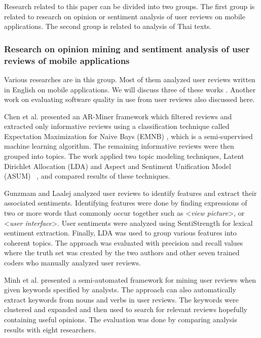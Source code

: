 Research related to this paper can be divided into two groups. The first group is related to research on opinion or sentiment analysis of user reviews on mobile applications. The second group is related to analysis of Thai texts.

\subsubsection{Research on opinion mining and sentiment analysis of user reviews of mobile applications} Various researches are in this group. Most of them analyzed user reviews written in English on mobile applications. We will discuss three of these works \cite{ar-miner,userslikefeature,keywordmining}. Another work on evaluating software quality in use from user reviews \cite{leopairote2} also discussed here.

Chen et al.\cite{ar-miner} presented an AR-Miner framework which filtered reviews and extracted only informative reviews using a classification technique called Expectation Maximization for Naive Bays (EMNB) \cite{EMNB}, which is a semi-supervised machine learning algorithm. The remaining informative reviews were then grouped into topics. The work applied two topic modeling techniques, Latent Dirichlet Allocation (LDA) \cite{LDA} and Aspect and Sentiment Unification Model (ASUM) ~\cite{asum}, and compared results of these techniques.

Gunzmam and Laalej \cite{userslikefeature} analyzed user reviews to identify features and extract their associated sentiments. Identifying features were done by finding expressions of two or more words that commonly occur together such as <\textit{view picture}>, or <\textit{user interface}>. User sentiments were analyzed using SentiStrength \cite{SentiStrength} for lexical sentiment extraction. Finally, LDA was used to group various features into coherent topics. The approach was evaluated with precision and recall values where the truth set was created by the two authors and other seven trained coders who manually analyzed user reviews. 

Minh et al. \cite{keywordmining} presented a semi-automated framework for mining user reviews when given keywords specified by analysts. The approach can also automatically extract keywords from nouns and verbs in user reviews. The keywords were clustered and expanded and then used to search for relevant reviews hopefully containing useful opinions. The evaluation was done by comparing analysis results with eight researchers.

